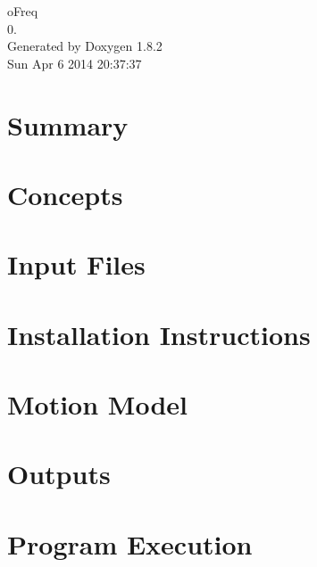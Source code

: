 \documentclass{book}
\begin{document}
\hypersetup{pageanchor=false,citecolor=blue}
\begin{titlepage}
\vspace*{7cm}
\begin{center}
{\Large o\-Freq \\[1ex]\large 0. }\\
\vspace*{1cm}
{\large Generated by Doxygen 1.8.2}\\
\vspace*{0.5cm}
{\small Sun Apr 6 2014 20:37:37}\\
\end{center}
\end{titlepage}
\clearemptydoublepage
{}
\tableofcontents
\clearemptydoublepage
{}
\hypersetup{pageanchor=true,citecolor=blue}
\chapter{Summary}
\label{index}\hypertarget{index}{}
\chapter{Concepts}
\label{concepts}
\hypertarget{concepts}{}

\chapter{Input Files}
\label{input_files}
\hypertarget{input_files}{}

\chapter{Installation Instructions}
\label{installation_instructions}
\hypertarget{installation_instructions}{}

\chapter{Motion Model}
\label{motion_model}
\hypertarget{motion_model}{}

\chapter{Outputs}
\label{outputs}
\hypertarget{outputs}{}

\chapter{Program Execution}
\label{program_execution}
\hypertarget{program_execution}{}

\end{document}
